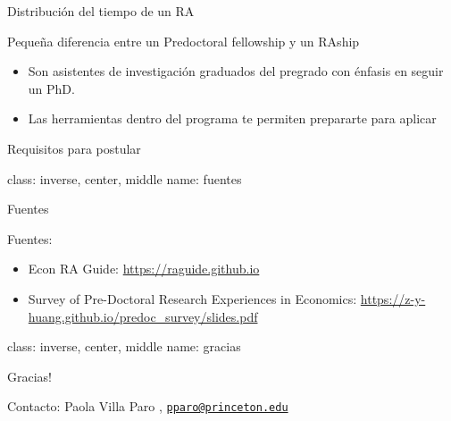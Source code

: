 \documentclass[
  ignorenonframetext,
]{beamer}
\providecommand{\tightlist}{%
  \setlength{\itemsep}{0pt}\setlength{\parskip}{0pt}}
\begin{document}
\begin{frame}{Distribución del tiempo de un RA}
\protect\hypertarget{distribuciuxf3n-del-tiempo-de-un-ra}{}

\end{frame}

\begin{frame}{Pequeña diferencia entre un Predoctoral fellowship y un
RAship}
\protect\hypertarget{pequeuxf1a-diferencia-entre-un-predoctoral-fellowship-y-un-raship}{}

\begin{itemize}
\tightlist
\item
  Son asistentes de investigación graduados del pregrado con énfasis en
  seguir un PhD.
\item
  Las herramientas dentro del programa te permiten prepararte para
  aplicar
\end{itemize}

\end{frame}

\begin{frame}{Requisitos para postular}
\protect\hypertarget{requisitos-para-postular}{}

\end{frame}

\begin{frame}

class: inverse, center, middle name: fuentes

\end{frame}

\begin{frame}{Fuentes}
\protect\hypertarget{fuentes}{}

\end{frame}

\begin{frame}{Fuentes:}
\protect\hypertarget{fuentes-1}{}

\begin{itemize}
\item
  Econ RA Guide: \url{https://raguide.github.io}
\item
  Survey of Pre-Doctoral Research Experiences in Economics:
  \url{https://z-y-huang.github.io/predoc_survey/slides.pdf}
\end{itemize}

\end{frame}

\begin{frame}

class: inverse, center, middle name: gracias

\end{frame}

\begin{frame}{Gracias!}
\protect\hypertarget{gracias}{}

Contacto: Paola Villa Paro ,
\href{mailto:pparo@princeton.edu}{\nolinkurl{pparo@princeton.edu}}

\end{frame}
\end{document}
